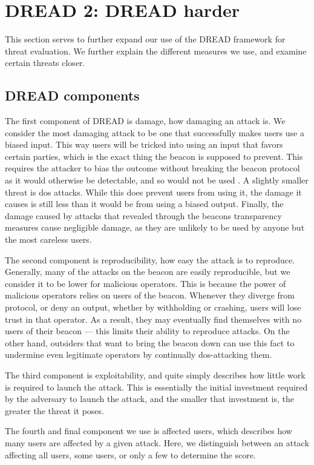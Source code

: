 \section{DREAD 2: DREAD harder}\label{app:dread}
This section serves to further expand our use of the DREAD framework for threat evaluation. We further explain the different measures we use, and examine certain threats closer.

\subsection{DREAD components}
The first component of DREAD is damage, how damaging an attack is. We consider the most damaging attack to be one that successfully makes users use a biased input. This way users will be tricked into using an input that favors certain parties, which is the exact thing the beacon is supposed to prevent. This requires the attacker to bias the outcome without breaking the beacon protocol as it would otherwise be detectable, and so would not be used .
A slightly smaller threat is \acrshort{dos} attacks. While this does prevent users from using it, the damage it causes is still less than it would be from using a biased output.
Finally, the damage caused by attacks that revealed through the beacons transparency measures cause negligible damage, as they are unlikely to be used by anyone but the most careless users.

The second component is reproducibility, how easy the attack is to reproduce. Generally, many of the attacks on the beacon are easily reproducible, but we consider it to be lower for malicious operators. This is because the power of malicious operators relies on users of the beacon. Whenever they diverge from protocol, or deny an output, whether by withholding or crashing, users will lose trust in that operator. As a result, they may eventually find themselves with no users of their beacon --- this limits their ability to reproduce attacks.
On the other hand, outsiders that want to bring the beacon down can use this fact to undermine even legitimate operators by continually \acrshort{dos}-attacking them.

The third component is exploitability, and quite simply describes how little work is required to launch the attack. This is essentially the initial investment required by the adversary to launch the attack, and the smaller that investment is, the greater the threat it poses.

The fourth and final component we use is affected users, which describes how many users are affected by a given attack. Here, we distinguish between an attack affecting all users, some users, or only a few to determine the score.

